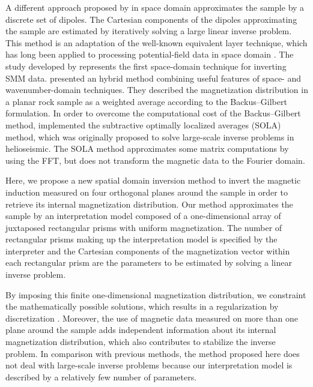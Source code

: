 \documentclass[galley,gc]{agutex}
\begin{document}
\begin{article}
A different approach proposed by \citep{weiss2007} in space domain
approximates the sample by a discrete set of dipoles.
The Cartesian components of the dipoles approximating the sample
are estimated by iteratively solving a large linear inverse problem.
This method is an adaptation of the well-known equivalent
layer technique, which has long been applied to processing
potential-field data in space domain \citep{dampney1969, emilia1973, 
vonfrese-etal1981, hansen-miyazaki1984, silva1986, leao-silva1989, 
cordell1992, mendonca1992, mendonca-silva1994, mendonca-silva1995,
guspi-novara2009, li-oldenburg2010, barnes-lumley2011, 
oliveirajr-etal2013, kara-etal2014, li-nabighian-oldenburg2014,
barnes2014}.
The study developed by \citep{weiss2007} represents the first
space-domain technique for inverting SMM data.
\citet{usui2012} presented an hybrid method combining
useful features of space- and wavenumber-domain techniques.
They described the magnetization distribution in a planar
rock sample as a weighted average according to the 
Backus–Gilbert formulation.
In order to overcome the computational cost of the 
Backus–Gilbert method, \citet{usui2012} implemented 
the subtractive optimally localized averages (SOLA) 
method, which was originally proposed to solve
large-scale inverse problems in helioseismic.
The SOLA method approximates some matrix computations 
by using the FFT, but does not transform the magnetic 
data to the Fourier domain.

Here, we propose a new spatial domain inversion
method to invert the magnetic induction measured on four 
orthogonal planes around the sample in order to retrieve its internal
magnetization distribution. 
Our method approximates the sample by an interpretation model 
composed of a one-dimensional array of juxtaposed rectangular 
prisms with uniform magnetization.
The number of rectangular prisms making 
up the interpretation model is specified by the interpreter and
the Cartesian components of the magnetization vector within 
each rectangular prism are the parameters to be estimated by 
solving a linear inverse problem.

By imposing this finite one-dimensional magnetization distribution, 
we constraint the mathematically possible solutions, which results
in a regularization by discretization \citep{engl1996, aster2005}.
Moreover, the use of magnetic data measured on more than one
plane around the sample adds independent information about
its internal magnetization distribution, which also contributes
to stabilize the inverse problem.
In comparison with previous methods,
the method proposed here does not deal with large-scale inverse problems 
because our interpretation model is described by a relatively 
few number of parameters.


\end{article}
\end{document}
